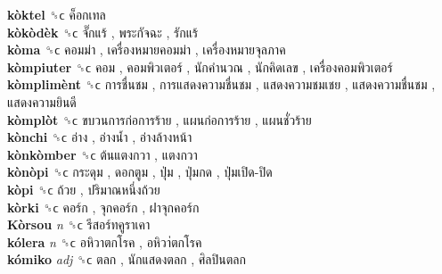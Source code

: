 \textbf{kòktel} ␝ϲ   ค็อกเทล   \\
\textbf{kòkòdèk} ␝ϲ   จั๊กแร้ ,  พระกัจฉะ ,  รักแร้   \\
\textbf{kòma} ␝ϲ   คอมม่า ,  เครื่องหมายคอมม่า ,  เครื่องหมายจุลภาค   \\
\textbf{kòmpiuter} ␝ϲ   คอม ,  คอมพิวเตอร์ ,  นักคำนวณ ,  นักคิดเลข ,  เครื่องคอมพิวเตอร์   \\
\textbf{kòmplimènt} ␝ϲ   การชื่นชม ,  การแสดงความชื่นชม ,  แสดงความชมเชย ,  แสดงความชื่นชม ,  แสดงความยินดี   \\
\textbf{kòmplòt} ␝ϲ   ขบวนการก่อการร้าย ,  แผนก่อการร้าย ,  แผนชั่วร้าย   \\
\textbf{kònchi} ␝ϲ   อ่าง ,  อ่างน้ำ ,  อ่างล้างหน้า   \\
\textbf{kònkòmber} ␝ϲ   ต้นแตงกวา ,  แตงกวา   \\
\textbf{kònòpi} ␝ϲ   กระดุม ,  ดอกตูม ,  ปุ่ม ,  ปุ่มกด ,  ปุ่มเปิด-ปิด   \\
\textbf{kòpi} ␝ϲ   ถ้วย ,  ปริมาณหนึ่งถ้วย   \\
\textbf{kòrki} ␝ϲ   คอร์ก ,  จุกคอร์ก ,  ฝาจุกคอร์ก   \\
\textbf{Kòrsou} \emph{n}  ␝ϲ   รีสอร์ทคูราเคา   \\
\textbf{kólera} \emph{n}  ␝ϲ   อหิวาตกโรค ,  อหิวา่ตกโรค   \\
\textbf{kómiko} \emph{adj}  ␝ϲ   ตลก ,  นักแสดงตลก ,  ศิลปินตลก   \\
